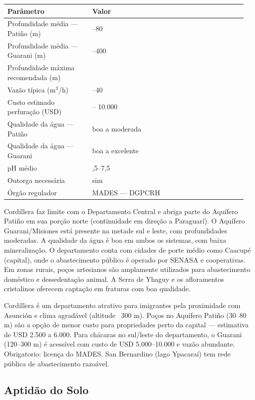 {\small
\setlength{\tabcolsep}{3pt}
\renewcommand{\arraystretch}{1.12}
\begin{tabularx}{\linewidth}{>{\raggedright\arraybackslash}p{0.34\linewidth} >{\raggedright\arraybackslash}p{0.62\linewidth}}
\toprule
Parâmetro & Valor \\
\midrule
Profundidade média --- Patiño (m) & 30--80 \\
Profundidade média --- Guarani (m) & 120--400 \\
Profundidade máxima recomendada (m) & 400 \\
Vazão típica (m$^3$/h) & 5--40 \\
Custo estimado perfuração (USD) & 2.500 -- 10.000 \\
Qualidade da água --- Patiño & boa a moderada \\
Qualidade da água --- Guarani & boa a excelente \\
pH médio & 6,5--7,5 \\
Outorga necessária & sim \\
Órgão regulador & MADES --- DGPCRH \\
\bottomrule
\end{tabularx}
}


Cordillera faz limite com o Departamento Central e abriga parte do Aquífero Patiño em sua porção norte (continuidade em direção a Paraguarí). O Aquífero Guarani/Misiones está presente na metade sul e leste, com profundidades moderadas. A qualidade da água é boa em ambos os sistemas, com baixa mineralização. O departamento conta com cidades de porte médio como Caacupé (capital), onde o abastecimento público é operado por SENASA e cooperativas. Em zonas rurais, poços artesianos são amplamente utilizados para abastecimento doméstico e dessedentação animal. A Serra de Yhaguy e os afloramentos cristalinos oferecem captação em fraturas com boa qualidade.


Cordillera é um departamento atrativo para imigrantes pela proximidade com Asunción e clima agradável (altitude ~300 m). Poços no Aquífero Patiño (30--80 m) são a opção de menor custo para propriedades perto da capital --- estimativa de USD 2.500 a 6.000. Para chácaras no sul/leste do departamento, o Guarani (120--300 m) é acessível com custo de USD 5.000--10.000 e vazão abundante. Obrigatorio: licença do MADES. San Bernardino (lago Ypacaraí) tem rede pública de abastecimento razoável.




\subsection{Aptidão do Solo}



